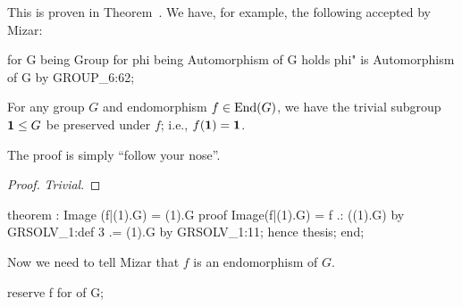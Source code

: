 This is proven in Theorem~. We have, for
example, the following accepted by Mizar:

\begin{mizar}
for G being Group
for phi being Automorphism of G
holds phi" is Automorphism of G by GROUP_6:62;
\end{mizar}

\begin{theorem}\label{thm:characteristic:automorphism:trivial-subgroup-invariant-under-automorphisms}
For any group $G$ and endomorphism $f\in\operatorname{End}(G)$, we have the trivial
subgroup $\mathbf{1}\leq G$ be preserved under $f$; i.e.,
$f(\mathbf{1})=\mathbf{1}$.
\end{theorem}

The proof is simply ``follow your nose''.

\begin{proof}
\emph{Trivial}.
\end{proof}

\nwenddocs{}\endmoddef\nwstartdeflinemarkup{}\nwenddeflinemarkup
theorem :
  Image (f|(1).G) = (1).G
proof
  Image(f|(1).G) = f .: ((1).G) by GRSOLV_1:def 3
                .= (1).G by GRSOLV_1:11;
  hence thesis;
end;
\eatline
{}\nwendcode{}\nwdocspar
\begin{reserve}
Now we need to tell Mizar that $f$ is an endomorphism of $G$.
\end{reserve}

\nwenddocs{}\endmoddef\nwstartdeflinemarkup{}\nwenddeflinemarkup
reserve f for  of G;
\nwendcode{}\nwdocspar


